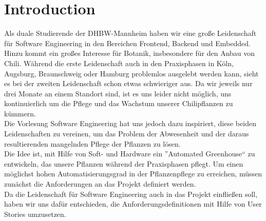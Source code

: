 \section{Introduction}
Als duale Studierende der DHBW-Mannheim haben wir eine große Leidenschaft für Software Engineering in den Bereichen Frontend, Backend und Embedded.
Hinzu kommt ein großes Interesse für Botanik, insbesondere für den Anbau von Chili. 
Während die erste Leidenschaft auch in den Praxisphasen in Köln, Augsburg, Braunschweig oder Hamburg problemlos ausgelebt werden kann, 
sieht es bei der zweiten Leidenschaft schon etwas schwieriger aus. 
Da wir jeweils nur drei Monate an einem Standort sind, ist es uns leider nicht möglich, uns kontinuierlich um die Pflege und das Wachstum unserer Chilipflanzen zu kümmern. 
\\
Die Vorlesung Software Engineering hat uns jedoch dazu inspiriert, diese beiden Leidenschaften zu vereinen, um das Problem der Abwesenheit und der daraus resultierenden mangelnden Pflege der Pflanzen zu lösen. 
\\
Die Idee ist, mit Hilfe von Soft- und Hardware ein ''Automated Greenhouse`` zu entwickeln, das unsere Pflanzen während der Praxisphasen pflegt. Um einen möglichst hohen Automatisierungsgrad in der Pflanzenpflege zu erreichen, müssen zunächst die Anforderungen an das Projekt definiert werden.
\\
Da die Leidenschaft für Software Engineering auch in das Projekt einfließen soll, haben wir uns dafür entschieden, die Anforderungsdefinitionen mit Hilfe von User Stories umzusetzen.
\\
